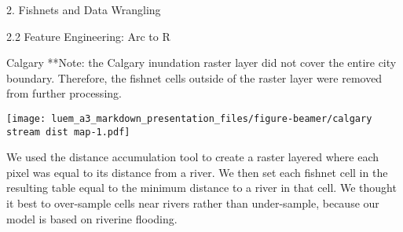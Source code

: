\documentclass[
  ignorenonframetext,
]{beamer}
\newenvironment{Shaded}{\begin{snugshade}}{\end{snugshade}}
\newcommand{\AttributeTok}[1]{\textcolor[rgb]{0.77,0.63,0.00}{#1}}
\newcommand{\ConstantTok}[1]{\textcolor[rgb]{0.00,0.00,0.00}{#1}}
\newcommand{\DecValTok}[1]{\textcolor[rgb]{0.00,0.00,0.81}{#1}}
\newcommand{\FloatTok}[1]{\textcolor[rgb]{0.00,0.00,0.81}{#1}}
\newcommand{\FunctionTok}[1]{\textcolor[rgb]{0.00,0.00,0.00}{#1}}
\newcommand{\NormalTok}[1]{#1}
\newcommand{\SpecialCharTok}[1]{\textcolor[rgb]{0.00,0.00,0.00}{#1}}
\newcommand{\StringTok}[1]{\textcolor[rgb]{0.31,0.60,0.02}{#1}}
\begin{document}
\begin{frame}[fragile]{2. Fishnets and Data Wrangling}
\begin{block}{2.2 Feature Engineering: Arc to R}
\begin{block}{Calgary}
**Note: the Calgary inundation raster layer did not cover the entire
city boundary. Therefore, the fishnet cells outside of the raster layer
were removed from further processing.

\begin{Shaded}
\end{Shaded}

\texttt{[image: luem\_a3\_markdown\_presentation\_files/figure-beamer/calgary stream dist map-1.pdf]}

We used the distance accumulation tool to create a raster layered where
each pixel was equal to its distance from a river. We then set each
fishnet cell in the resulting table equal to the minimum distance to a
river in that cell. We thought it best to over-sample cells near rivers
rather than under-sample, because our model is based on riverine
flooding.


\end{block}
\end{block}
\end{frame}
\end{document}
